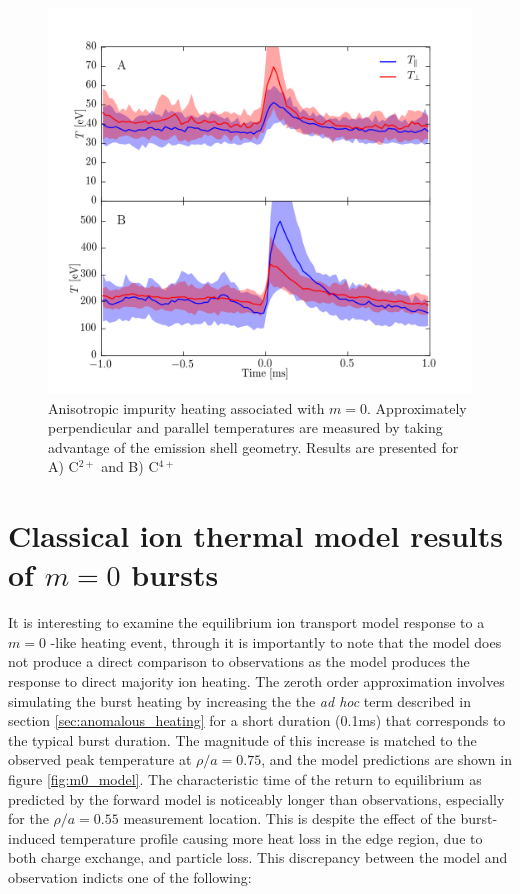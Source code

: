 \begin{refsection}
\begin{figure}
	\centering
	\includegraphics[width = 1.\linewidth]{./m0_and_impurity_heating/m0_anisotropy.png}
	\caption[Anisotropic impurity heating associated with $m = 0$.]{Anisotropic impurity heating associated with $m = 0$. Approximately perpendicular and parallel temperatures are measured by taking advantage of the emission shell geometry. Results are presented for A) C$^{2+}$ and B)  C$^{4+}$}\label{fig:m0_anisotropy}
\end{figure}

\section{Classical ion thermal model results of $m = 0$ bursts}\label{sec:m0_v_model}

It is interesting to examine the equilibrium ion transport model response to a $m = 0$ -like heating event, through it is importantly to note that the model does not produce a direct comparison to observations as the model produces the response to direct majority ion heating. The zeroth order approximation involves simulating the burst heating by increasing the the \textit{ad hoc} term described in section \ref{sec:anomalous_heating} for a short duration (0.1ms) that corresponds to the typical burst duration. The magnitude of this increase is matched to the observed peak temperature at $\rho/a = 0.75$, and the model predictions are shown in figure \ref{fig:m0_model}. The characteristic time of the return to equilibrium as predicted by the forward model is noticeably longer than observations, especially for the $\rho/a = 0.55$ measurement location. This is despite the effect of the burst-induced temperature profile causing more heat loss in the edge region, due to both charge exchange, and particle loss. This discrepancy between the model and observation indicts one of the following:


\end{refsection}
